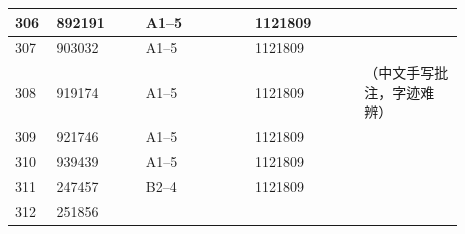 \documentclass[UTF8,10pt,a4paper,fontset=fandol]{ctexart}
\newcommand{\fieldvalue}[1]{#1}
\newcommand{\handwritten}[1]{#1}
\begin{document}
\begin{center}
\begin{tabular}{|p{0.07\linewidth}|p{0.18\linewidth}|p{0.22\linewidth}|p{0.22\linewidth}|p{0.20\linewidth}|}
\fieldvalue{306} &
\fieldvalue{892191} &
\fieldvalue{A1--5} &
\fieldvalue{1121809} & \\ \hline
\fieldvalue{307} &
\fieldvalue{903032} &
\fieldvalue{A1--5} &
\fieldvalue{1121809} & \\ \hline
\fieldvalue{308} &
\fieldvalue{919174} &
\fieldvalue{A1--5} &
\fieldvalue{1121809} &
\fieldvalue{\handwritten{（中文手写批注，字迹难辨）}} \\ \hline
\fieldvalue{309} &
\fieldvalue{921746} &
\fieldvalue{A1--5} &
\fieldvalue{1121809} & \\ \hline
\fieldvalue{310} &
\fieldvalue{939439} &
\fieldvalue{A1--5} &
\fieldvalue{1121809} & \\ \hline
\fieldvalue{311} &
\fieldvalue{247457} &
\fieldvalue{B2--4} &
\fieldvalue{1121809} & \\ \hline
\fieldvalue{312} &
\fieldvalue{251856} &

\end{tabular}
\end{center}
\end{document}
